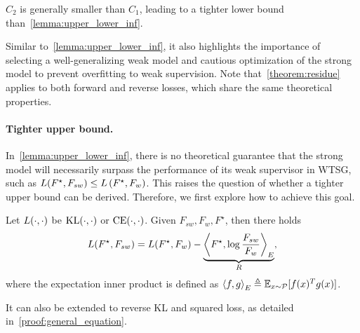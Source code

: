 \begin{remark}
$C_2$ is generally smaller than $C_1$, leading to a tighter lower bound than~\cref{lemma:upper_lower_inf}.
\end{remark}

Similar to~\cref{lemma:upper_lower_inf}, it also highlights the importance of selecting a well-generalizing weak model and cautious optimization of the strong model to prevent overfitting to weak supervision.
Note that~\cref{theorem:residue} applies to both forward and reverse losses, which share the same theoretical properties.




\paragraph{Tighter upper bound.}
In~\cref{lemma:upper_lower_inf},
there is no theoretical guarantee that the strong model will necessarily surpass the performance of its weak supervisor in WTSG, such as $L(F^\star, F_{sw}) \le L\left( F^\star, F_w \right)$.
This raises the question of whether a tighter upper bound can be derived.
Therefore, we first explore how to achieve this goal.

\begin{proposition} \label{prop:general_equation}
Let $L(\cdot, \cdot)$ be $\mathrm{KL}(\cdot, \cdot)$ or $\mathrm{CE}(\cdot, \cdot)$. Given $F_{sw}, F_w, F^\star$, then there holds
\begin{align*}
    L(F^\star, F_{sw}) = L(F^\star, F_w) - \underbrace{\left \langle F^\star, \log{\frac{F_{sw}}{F_w}} \right \rangle_E}_{R},
\end{align*}
where the expectation inner product is defined as $\left \langle f,g \right \rangle_E \triangleq \mathbb{E}_{x \sim \mathcal{P}} [f(x)^Tg(x)]$.
\end{proposition}

\begin{remark}
    It can also be extended to reverse KL and squared loss, as detailed in~\cref{proof:general_equation}.
\end{remark}


